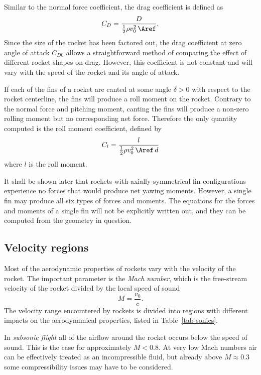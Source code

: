 Similar to the normal force coefficient, the drag coefficient is
defined as
%
\begin{equation}
C_D = \frac{D}{\frac{1}{2}\rho v_0^2 \, \Aref}.
\label{eq-CD-def}
\end{equation}
%
Since the size of the rocket has been factored out, the drag
coefficient at zero angle of attack $C_{D0}$ allows a straightforward
method of comparing the effect of different rocket shapes on drag.
However, this coefficient is not constant and will vary with \eg the
speed of the rocket and its angle of attack.


If each of the fins of a rocket are canted at some angle $\delta>0$
with respect to the rocket centerline, the fins will produce a roll
moment on the rocket.  Contrary to the normal force and pitching
moment, canting the fins will produce a non-zero rolling moment but no
corresponding net force.  Therefore the only quantity computed is the
roll moment coefficient, defined by
%
\begin{equation}
C_l  =  \frac{l}{\frac{1}{2}\rho v_0^2 \, \Aref\, d}
\label{eq-Cl-def}
\end{equation}
%
where $l$ is the roll moment.

It shall be shown later that rockets with axially-symmetrical fin
configurations experience no forces that would produce net yawing
moments. However, a single fin may produce all six types of forces and
moments. The equations for the forces and moments of a single fin will
not be explicitly written out, and they can be computed from the
geometry in question.



\subsection{Velocity regions}

Most of the aerodynamic properties of rockets vary with the velocity
of the rocket.  The important parameter is the {\it Mach number},
which is the free-stream velocity of the rocket divided by the local
speed of sound
%
\begin{equation}
M = \frac{v_0}{c}.
\end{equation}
%
The velocity range encountered by rockets is divided into regions with
different impacts on the aerodynamical properties, listed in
Table~\ref{tab-sonics}.  

In {\it subsonic flight} all of the airflow around the rocket occurs
below the speed of sound.  This is the case for approximately $M<0.8$.
At very low Mach numbers air can be effectively treated as an
incompressible fluid, but already above $M\approx 0.3$ some
compressibility issues may have to be considered.

